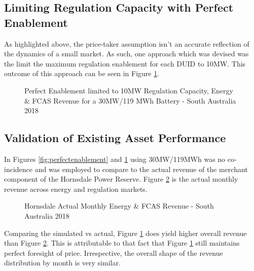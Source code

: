 \subsection{Limiting Regulation Capacity with Perfect Enablement}
As highlighted above, the price-taker assumption isn't an accurate reflection of the dynamics of a small market. As such, one approach which was devised was the limit the maximum regulation enablement for each DUID to 10MW. This outcome of this approach can be seen in Figure \ref{fig:coop_limit}. 
\begin{figure}[H]
    \centering
    \caption{Perfect  Enablement limited to 10MW Regulation Capacity, Energy  \&  FCAS  Revenue  for  a  30MW/119 MWh  Battery  -  South Australia 2018}
    \label{fig:coop_limit}
\end{figure}
\subsection{ Validation of Existing Asset Performance  }
In Figures \ref{fig:perfectenablement} and \ref{fig:coop_limit} using 30MW/119MWh was no co-incidence and was employed to compare to the actual revenue of the merchant component of the Hornsdale Power Reserve. Figure \ref{fig:hpr_actual} is the actual monthly revenue across energy and regulation markets.
\begin{figure}[H]
    \centering
    \caption{Hornsdale Actual Monthly Energy & FCAS Revenue - South Australia 2018}
    \label{fig:hpr_actual}
\end{figure}
Comparing the simulated vs actual, Figure \ref{fig:coop_limit} does yield higher overall revenue than Figure \ref{fig:hpr_actual}. This is attributable to that fact that Figure \ref{fig:coop_limit} still maintains perfect foresight of price. Irrespective, the overall shape of the revenue distribution by month is very similar. 
